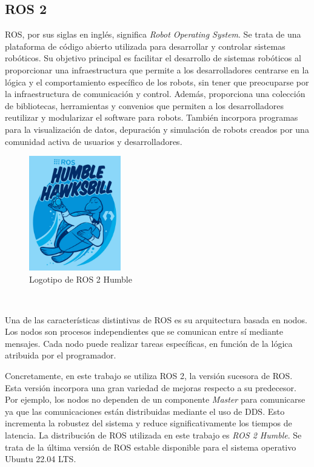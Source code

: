 \subsection{ROS 2}
\label{subsec:ros2}
\noindent ROS, por sus siglas en inglés, significa \textit{Robot Operating System}. Se trata de una plataforma de código abierto utilizada 
para desarrollar y controlar sistemas robóticos. Su objetivo principal es facilitar el desarrollo de sistemas robóticos al proporcionar una infraestructura que permite a
los desarrolladores centrarse en la lógica y el comportamiento específico de los robots, sin tener que preocuparse por la 
infraestructura de comunicación y control. Además, proporciona una colección de bibliotecas, herramientas y convenios que permiten a los desarrolladores 
reutilizar y modularizar el software para robots. También incorpora programas para la visualización de datos, depuración y 
simulación de robots creados por una comunidad activa de usuarios y desarrolladores.
\begin{figure} [h!]
  \begin{center}
    \includegraphics[width=4cm]{figs/ros2logo.jpeg}
  \end{center}
  \caption{Logotipo de ROS 2 Humble}
  \label{fig:ros2logo}
\end{figure}\ 



Una de las características distintivas de ROS es su arquitectura basada en nodos. Los nodos son procesos independientes 
que se comunican entre sí mediante mensajes. Cada nodo puede realizar tareas específicas, en función de la lógica atribuida por el programador.

Concretamente, en este trabajo se utiliza ROS 2, la versión sucesora de ROS. Esta versión incorpora una gran variedad de mejoras respecto 
a su predecesor. Por ejemplo, los nodos no dependen de un componente \textit{Master} para comunicarse ya que las comunicaciones 
están distribuidas mediante el uso de \ac{DDS}. Esto incrementa la robustez del sistema y reduce significativamente los tiempos de latencia. La distribución de ROS utilizada en este trabajo es \textit{ROS 2 Humble}. Se trata de la última versión de ROS estable disponible para 
el sistema operativo Ubuntu 22.04 LTS.

